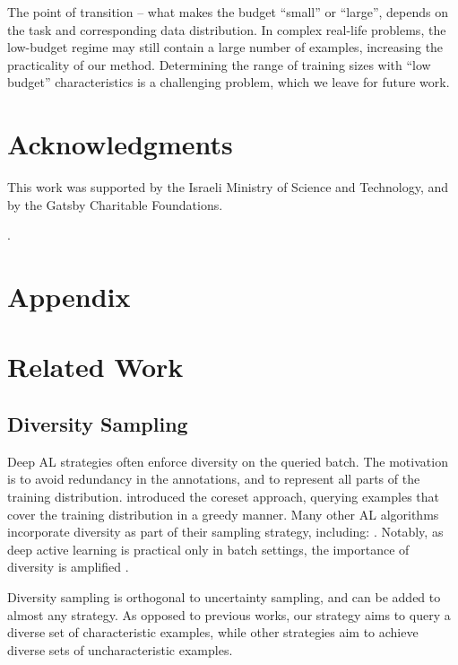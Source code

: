 \documentclass{article}
\begin{document}
The point of transition -- what makes the budget ``small'' or ``large'', depends on the task and corresponding data distribution. In complex real-life problems, the low-budget regime may still contain a large number of examples, increasing the practicality of our method. Determining the range of training sizes with ``low budget'' characteristics is a challenging problem, which we leave for future work.

\section*{Acknowledgments}
This work was supported by the Israeli Ministry of Science and Technology, and by the Gatsby Charitable Foundations.














\newpage
.


\newpage
\appendix

\section*{Appendix}

\section{Related Work}
\label{app:related_work}
\subsection{Diversity Sampling}

Deep AL strategies often enforce diversity on the queried batch. The motivation is to avoid redundancy in the annotations, and to represent all parts of the training distribution. \citet{sener2018active} introduced the coreset approach, querying examples that cover the training distribution in a greedy manner. Many other AL algorithms incorporate diversity as part of their sampling strategy, including: \citet{hu2010off,elhamifar2013convex,yang2015multi,wang2016batch,yin2017deep,zhdanov2019diverse,he2019towards,kirsch2019batchbald,DBLP:conf/iclr/AshZK0A20,shui2020deep}. Notably, as deep active learning is practical only in batch settings, the importance of diversity is amplified \citep{geifman2017deep, sener2018active}.

Diversity sampling is orthogonal to uncertainty sampling, and can be added to almost any strategy. As opposed to previous works, our strategy aims to query a diverse set of characteristic examples, while other strategies aim to achieve diverse sets of uncharacteristic examples.
\end{document}
